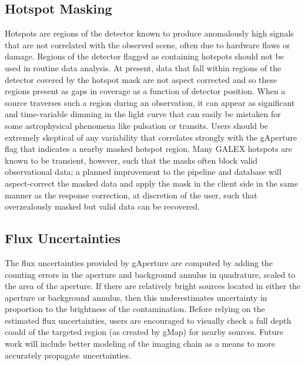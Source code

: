 \documentclass[preprint]{aastex}
\begin{document}
\subsection{Hotspot Masking}
\label{hotspot}
Hotspots are regions of the detector known to produce anomalously high signals that are not correlated with the observed scene, often due to hardware flaws or damage. Regions of the detector flagged as containing hotspots should not be used in routine data analysis. At present, data that fall within regions of the detector covered by the hotspot mask are not aspect corrected and so these regions present as gaps in coverage as a function of detector position. When a source traverses such a region during an observation, it can appear as significant and time-variable dimming in the light curve that can easily be mistaken for some astrophysical phenomena like pulsation or transits. Users should be extremely skeptical of any variability that correlates strongly with the gAperture flag that indicates a nearby masked hotspot region. Many GALEX hotspots are known to be transient, however, such that the masks often block valid observational data; a planned improvement to the pipeline and database will aspect-correct the masked data and apply the mask in the client side in the same manner as the response correction, at discretion of the user, such that overzealously masked but valid data can be recovered.

\subsection{Flux Uncertainties}
\label{fluxuncert}
The flux uncertainties provided by gAperture are computed by adding the counting errors in the aperture and background annulus in quadrature, scaled to the area of the aperture. If there are relatively bright sources located in either the aperture or background annulus, then this underestimates uncertainty in proportion to the brightness of the contamination. Before relying on the estimated flux uncertainties, users are encouraged to visually check a full depth coadd of the targeted region (as created by gMap) for nearby sources. Future work will include better modeling of the imaging chain as a means to more accurately propagate uncertainties.
\end{document}
